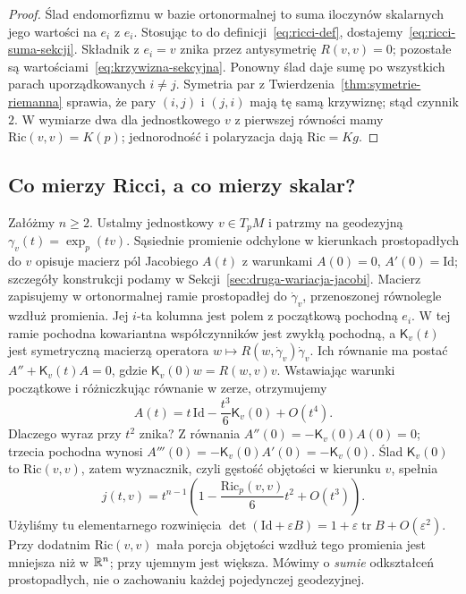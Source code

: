 \begin{proof}
Ślad endomorfizmu w bazie ortonormalnej to suma
iloczynów skalarnych jego wartości na $e_i$ z $e_i$.
Stosując to do definicji~\eqref{eq:ricci-def},
dostajemy~\eqref{eq:ricci-suma-sekcji}. Składnik
z $e_i=v$ znika przez antysymetrię $R(v,v)=0$;
pozostałe są wartościami~\eqref{eq:krzywizna-sekcyjna}.
Ponowny ślad daje sumę po wszystkich parach
uporządkowanych $i\ne j$. Symetria par z
Twierdzenia~\ref{thm:symetrie-riemanna} sprawia,
że pary $(i,j)$ i $(j,i)$ mają tę samą krzywiznę;
stąd czynnik $2$. W wymiarze dwa dla jednostkowego
$v$ z pierwszej równości mamy
$\mathrm{Ric}(v,v)=K(p)$; jednorodność i polaryzacja
dają $\mathrm{Ric}=Kg$.
\end{proof}

\subsection*{Co mierzy Ricci, a co mierzy skalar?}
Załóżmy $n\geq2$. Ustalmy jednostkowy $v\in T_pM$ i patrzmy na geodezyjną
$\gamma_v(t)=\exp_p(tv)$. Sąsiednie promienie odchylone
w kierunkach prostopadłych do $v$ opisuje macierz pól
Jacobiego $A(t)$ z warunkami
$A(0)=0$, $A'(0)=\mathrm{Id}$; szczegóły konstrukcji
podamy w Sekcji~\ref{sec:druga-wariacja-jacobi}.
Macierz zapisujemy w ortonormalnej ramie prostopadłej
do $\dot\gamma_v$, przenoszonej równolegle wzdłuż promienia.
Jej $i$-ta kolumna jest polem z początkową pochodną $e_i$.
W tej ramie pochodna kowariantna współczynników jest zwykłą
pochodną, a $\mathsf K_v(t)$ jest symetryczną macierzą
operatora $w\mapsto R(w,\dot\gamma_v)\dot\gamma_v$.
Ich równanie ma postać
$A''+\mathsf K_v(t)A=0$, gdzie
$\mathsf K_v(0)w=R(w,v)v$. Wstawiając warunki
początkowe i różniczkując równanie w zerze, otrzymujemy
\[
 A(t)=t\,\mathrm{Id}-\frac{t^3}{6}\mathsf K_v(0)+O(t^4).
\]
Dlaczego wyraz przy $t^2$ znika? Z równania
$A''(0)=-\mathsf K_v(0)A(0)=0$; trzecia pochodna
wynosi $A'''(0)=-\mathsf K_v(0)A'(0)=-\mathsf K_v(0)$.
Ślad $\mathsf K_v(0)$ to $\mathrm{Ric}(v,v)$, zatem
wyznacznik, czyli gęstość objętości w kierunku $v$,
spełnia
\begin{equation}\label{eq:ricci-gestosc-malej-kuli}
 j(t,v)=t^{n-1}\left(1-\frac{\mathrm{Ric}_p(v,v)}6t^2
                              +O(t^3)\right).
\end{equation}
Użyliśmy tu elementarnego rozwinięcia
$\det(\mathrm{Id}+\varepsilon B)
=1+\varepsilon\operatorname{tr}B+O(\varepsilon^2)$.
Przy dodatnim $\mathrm{Ric}(v,v)$ mała porcja objętości
wzdłuż tego promienia jest mniejsza niż w $\mathbb{R}^n$;
przy ujemnym jest większa. Mówimy o \emph{sumie}
odkształceń prostopadłych, nie o zachowaniu każdej
pojedynczej geodezyjnej.

